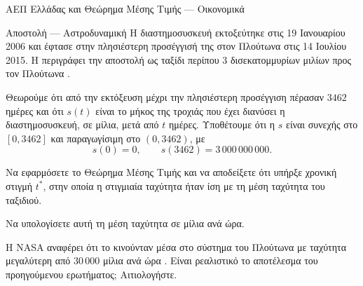 \begin{problhma}{ΑΕΠ Ελλάδας και Θεώρημα Μέσης Τιμής --- Οικονομικά}
\begin{center}
\end{center}
\end{problhma}

\begin{problhma}{Αποστολή  --- Αστροδυναμική}
Η διαστημοσυσκευή  εκτοξεύτηκε στις
19 Ιανουαρίου 2006 και έφτασε στην πλησιέστερη προσέγγισή της στον
Πλούτωνα στις 14 Ιουλίου 2015. Η  περιγράφει την αποστολή ως
ταξίδι περίπου \(3\) δισεκατομμυρίων μιλίων προς τον Πλούτωνα
\cite{nasaNewHorizonsPlutoEncounter,stern2007newHorizonsOverview}.

Θεωρούμε ότι από την εκτόξευση μέχρι την πλησιέστερη προσέγγιση
πέρασαν \(3462\) ημέρες και ότι \(s(t)\) είναι το μήκος της τροχιάς που
έχει διανύσει η διαστημοσυσκευή, σε μίλια, μετά από \(t\) ημέρες.
Υποθέτουμε ότι η \(s\) είναι συνεχής στο \([0,3462]\) και παραγωγίσιμη
στο \((0,3462)\), με
\[
  s(0)=0,
  \qquad
  s(3462)=3\,000\,000\,000.
\]
\begin{alist}
  \item Να εφαρμόσετε το Θεώρημα Μέσης Τιμής και να αποδείξετε ότι
        υπήρξε χρονική στιγμή \(t^*\), στην οποία η στιγμιαία ταχύτητα
        ήταν ίση με τη μέση ταχύτητα του ταξιδιού.
  \item Να υπολογίσετε αυτή τη μέση ταχύτητα σε μίλια ανά ώρα.
  \item Η NASA αναφέρει ότι το  κινούνταν μέσα στο
        σύστημα του Πλούτωνα με ταχύτητα μεγαλύτερη από \(30\,000\)
        μίλια ανά ώρα \cite{nasaNewHorizonsPlutoEncounter}. Είναι
        ρεαλιστικό το αποτέλεσμα του προηγούμενου ερωτήματος;
        Αιτιολογήστε.
\end{alist}
\end{problhma}

